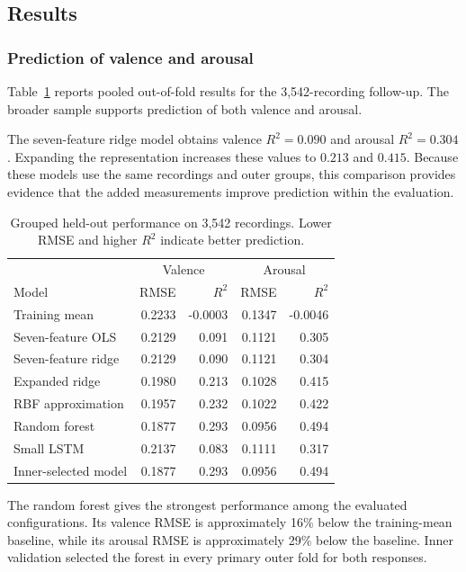 \subsection{Results}
\label{sec:results}

\subsubsection{Prediction of valence and arousal}

Table~\ref{tab:performance} reports pooled out-of-fold results for the 3,542-recording follow-up. The broader sample supports prediction of both valence and arousal.

The seven-feature ridge model obtains valence $R^2=0.090$ and arousal $R^2=0.304$. Expanding the representation increases these values to $0.213$ and $0.415$. Because these models use the same recordings and outer groups, this comparison provides evidence that the added measurements improve prediction within the evaluation.

\begin{table}[ht]
\centering
\caption{Grouped held-out performance on 3,542 recordings. Lower RMSE and higher $R^2$ indicate better prediction.}
\label{tab:performance}
\begin{tabular}{lrrrr}
\toprule
& \multicolumn{2}{c}{Valence}
& \multicolumn{2}{c}{Arousal} \\
Model & RMSE & $R^2$ & RMSE & $R^2$ \\
\midrule
Training mean
& 0.2233 & -0.0003 & 0.1347 & -0.0046 \\
Seven-feature OLS
& 0.2129 & 0.091 & 0.1121 & 0.305 \\
Seven-feature ridge
& 0.2129 & 0.090 & 0.1121 & 0.304 \\
Expanded ridge
& 0.1980 & 0.213 & 0.1028 & 0.415 \\
RBF approximation
& 0.1957 & 0.232 & 0.1022 & 0.422 \\
Random forest
& 0.1877 & 0.293 & 0.0956 & 0.494 \\
Small LSTM
& 0.2137 & 0.083 & 0.1111 & 0.317 \\
Inner-selected model
& 0.1877 & 0.293 & 0.0956 & 0.494 \\
\bottomrule
\end{tabular}
\end{table}

The random forest gives the strongest performance among the evaluated configurations. Its valence RMSE is approximately 16\% below the training-mean baseline, while its arousal RMSE is approximately 29\% below the baseline. Inner validation selected the forest in every primary outer fold for both responses.

